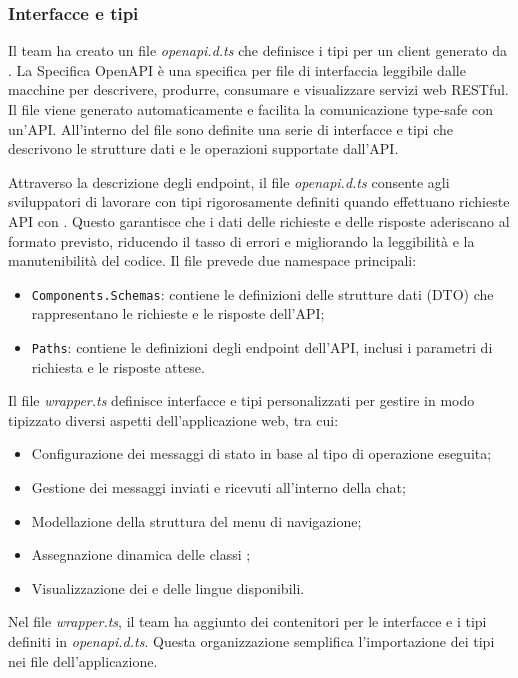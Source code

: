 \subsubsection{Interfacce e tipi} \label{InterfacceTipi}

 \label{OpenAPI}

\par Il team ha creato un file \textit{openapi.d.ts} che definisce i tipi  per un client generato da . La Specifica OpenAPI è una specifica per file di interfaccia leggibile dalle macchine per descrivere, produrre, consumare e visualizzare servizi web RESTful. Il file viene generato automaticamente e facilita la comunicazione type-safe con un'API. All'interno del file sono definite una serie di interfacce e tipi che descrivono le strutture dati e le operazioni supportate dall'API.

\par Attraverso la descrizione degli endpoint, il file \textit{openapi.d.ts} consente agli sviluppatori  di lavorare con tipi rigorosamente definiti quando effettuano richieste API con . Questo garantisce che i dati delle richieste e delle risposte aderiscano al formato previsto, riducendo il tasso di errori e migliorando la leggibilità e la manutenibilità del codice. Il file prevede due namespace principali:
\begin{itemize}
  \item \texttt{Components.Schemas}: contiene le definizioni delle strutture dati (DTO) che rappresentano le richieste e le risposte dell'API;
  \item \texttt{Paths}: contiene le definizioni degli endpoint dell'API, inclusi i parametri di richiesta e le risposte attese.
\end{itemize}

 \label{OpenAPI}

\par Il file \textit{wrapper.ts} definisce interfacce e tipi personalizzati per gestire in modo tipizzato diversi aspetti dell'applicazione web, tra cui:
\begin{itemize}
  \item Configurazione dei messaggi di stato in base al tipo di operazione eseguita;
  \item Gestione dei messaggi inviati e ricevuti all'interno della chat;
  \item Modellazione della struttura del menu di navigazione;
  \item Assegnazione dinamica delle classi ;
  \item Visualizzazione dei  e delle lingue disponibili.
\end{itemize}

\vspace{0.5\baselineskip}
\par Nel file \textit{wrapper.ts}, il team ha aggiunto dei contenitori per le interfacce e i tipi definiti in \textit{openapi.d.ts}. Questa organizzazione semplifica l'importazione dei tipi nei file dell'applicazione.